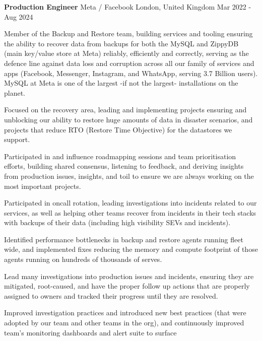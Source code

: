 \begin{cventries}
	\cventry
	{\textbf{Production Engineer}} %
	{Meta / Facebook} %
	{London, United Kingdom} %
	{Mar 2022 - Aug 2024} %
	{
		\begin{cvitems} %
			\item {Member of the Backup and Restore team, building services and tooling ensuring the ability to recover data
			            from backups for both the MySQL and ZippyDB (main key/value store at Meta) reliably, efficiently and
			            correctly, serving as the defence line against data loss and corruption across all our family of
			            services and apps (Facebook, Messenger, Instagram, and WhatsApp, serving 3.7 Billion users). MySQL at
			            Meta is one of the largest -if not the largest- installations on the planet.}
			\item {Focused on the recovery area, leading and implementing projects ensuring and unblocking our ability to
			            restore huge amounts of data in disaster scenarios, and projects that reduce RTO (Restore Time
			            Objective) for the datastores we support.}
			\item {Participated in and influence roadmapping sessions and team prioritisation efforts, building shared
			            consensus, listening to feedback, and deriving insights from production issues, insights, and toil to
			            ensure we are always working on the most important projects.}
			\item {Participated in oncall rotation, leading investigations into incidents related to our services, as well as
			            helping other teams recover from incidents in their tech stacks with backups of their data (including
			            high visibility SEVs and incidents).}
			\item {Identified performance bottlenecks in backup and restore agents running fleet wide, and implemented fixes
			            reducing the memory and compute footprint of those agents running on hundreds of thousands of serves.}
			\item {Lead many investigations into production issues and incidents, ensuring they are mitigated, root-caused, and
			            have the proper follow up actions that are properly assigned to owners and tracked their progress
			            until they are resolved.}
			\item {Improved investigation practices and introduced new best practices (that were adopted by our team and other
			            teams in the org), and continuously improved team's monitoring dashboards and alert suite to surface
}
\end{cvitems}}
\end{cventries}
